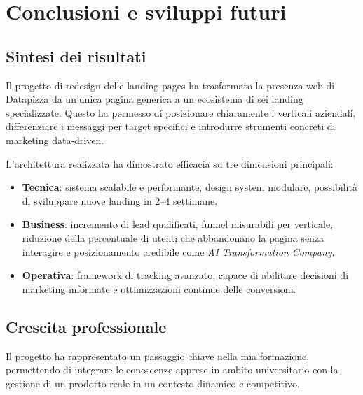 \chapter{Conclusioni e sviluppi futuri}

\section{Sintesi dei risultati}
Il progetto di redesign delle landing pages ha trasformato la presenza web di Datapizza
da un'unica pagina generica a un ecosistema di sei landing specializzate. 
Questo ha permesso di posizionare chiaramente i verticali aziendali, differenziare i messaggi
per target specifici e introdurre strumenti concreti di marketing data-driven.

L'architettura realizzata ha dimostrato efficacia su tre dimensioni principali:
\begin{itemize}
  \item \textbf{Tecnica}: sistema scalabile e performante, design system modulare, 
        possibilità di sviluppare nuove landing in 2--4 settimane.
  \item \textbf{Business}: incremento di lead qualificati, funnel misurabili per verticale,
        riduzione della percentuale di utenti che abbandonano la pagina senza interagire 
        e posizionamento credibile come \textit{AI Transformation Company}.
  \item \textbf{Operativa}: framework di tracking avanzato, capace di abilitare decisioni di marketing informate
        e ottimizzazioni continue delle conversioni.
\end{itemize}

\section{Crescita professionale}
Il progetto ha rappresentato un passaggio chiave nella mia formazione,
permettendo di integrare le conoscenze apprese in ambito universitario con la gestione
di un prodotto reale in un contesto dinamico e competitivo.

